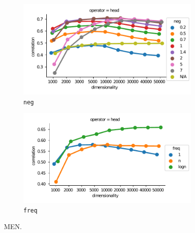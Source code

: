 \begin{figure}
  \centering

  \begin{subfigure}[t]{0.49\textwidth}
    \includegraphics[width=\textwidth]{supplement/figures/men-interaction-neg}

  \caption{\texttt{neg}}
  \label{fig:men-neg}
  \end{subfigure}
  \begin{subfigure}[t]{0.49\textwidth}
    \includegraphics[width=\textwidth]{supplement/figures/men-interaction-freq}

  \caption{\texttt{freq}}
  \label{fig:men-freq}
  \end{subfigure}

  \caption{MEN.}
\end{figure}
